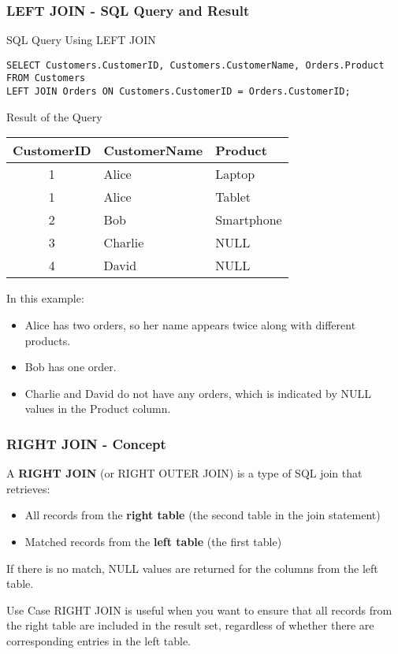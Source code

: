 \documentclass[aspectratio=169]{beamer}
\begin{document}
\begin{frame}[fragile]
    \frametitle{LEFT JOIN - SQL Query and Result}
    \begin{block}{SQL Query Using LEFT JOIN}
    \begin{lstlisting}
SELECT Customers.CustomerID, Customers.CustomerName, Orders.Product
FROM Customers
LEFT JOIN Orders ON Customers.CustomerID = Orders.CustomerID;
    \end{lstlisting}
    \end{block}

    \begin{block}{Result of the Query}
    \begin{tabular}{|c|l|l|}
    \hline
    CustomerID & CustomerName & Product     \\
    \hline
    1          & Alice         & Laptop      \\
    1          & Alice         & Tablet      \\
    2          & Bob           & Smartphone   \\
    3          & Charlie       & NULL        \\
    4          & David         & NULL        \\
    \hline
    \end{tabular}
    \end{block}

    In this example:
    \begin{itemize}
        \item Alice has two orders, so her name appears twice along with different products.
        \item Bob has one order.
        \item Charlie and David do not have any orders, which is indicated by NULL values in the Product column.
    \end{itemize}
\end{frame}

\begin{frame}[fragile]
    \frametitle{RIGHT JOIN - Concept}
    A \textbf{RIGHT JOIN} (or RIGHT OUTER JOIN) is a type of SQL join that retrieves:
    \begin{itemize}
        \item All records from the \textbf{right table} (the second table in the join statement)
        \item Matched records from the \textbf{left table} (the first table)
    \end{itemize}
    If there is no match, NULL values are returned for the columns from the left table.
    \begin{block}{Use Case}
        RIGHT JOIN is useful when you want to ensure that all records from the right table are included in the result set, regardless of whether there are corresponding entries in the left table.
    \end{block}
\end{frame}
\end{document}
